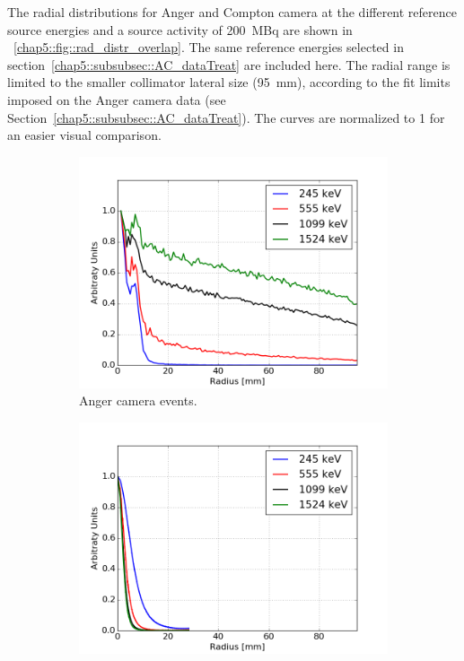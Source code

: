 The radial distributions for Anger and Compton camera at the different reference source energies and a source activity of 200~MBq are shown in \figurename~\ref{chap5::fig::rad_distr_overlap}. The same reference energies selected in section~\ref{chap5::subsubsec::AC_dataTreat} are included here. The radial range is limited to the smaller collimator lateral size (95~mm), according to the fit limits imposed on the Anger camera data (see Section~\ref{chap5::subsubsec::AC_dataTreat}). The curves are normalized to 1 for an easier visual comparison.

\begin{figure}
\begin{subfigure}{.5\textwidth}
\centering
  \includegraphics[width=\linewidth]{03_GraphicFiles/chapter5_SPECTsimu/SPECT/anger/radial_distribution_overlap}
  \caption{Anger camera events.}
  \label{chap5::fig::rad_distr_overlap_CA}
\end{subfigure}
\begin{subfigure}{.5\textwidth}
\centering
  \includegraphics[width=\linewidth]{03_GraphicFiles/chapter5_SPECTsimu/SPECT/compton/radial_distribution_overlap_sel}

\end{subfigure}
\end{figure}
